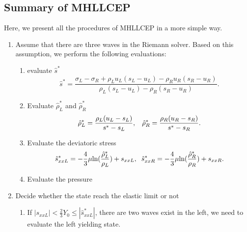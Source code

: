 \documentclass[review]{elsarticle}
\begin{document}
\subsection{Summary of MHLLCEP}
Here, we present all the procedures of MHLLCEP in a more simple way.
\begin{enumerate}
  \item  Assume  that there are three  waves in the Riemann solver. Based on this assumption, we perform the following evaluations:
  \begin{enumerate}
    \item evaluate  $\hat{s}^*$
    \begin{equation*}
       \hat{s}^* = \frac{\sigma_L-\sigma_R+\rho_L u_L(s_L-u_L)-\rho_R u_R(s_R-u_R)}{\rho_L(s_L-u_L)-\rho_R(s_R-u_R)}.
   \end{equation*}
    \item Evaluate  $\hat{\rho}_L^*$ and $\hat{\rho}_R^*$
    \begin{equation*}
       \hat{\rho}_L^* = \frac{\rho_L(u_L-s_L)}{s^*-s_L}, \hspace{0.3cm}  \hat{\rho}_R^* = \frac{\rho_R(u_R-s_R)}{s^*-s_R}.
    \end{equation*}
    \item Evaluate  the deviatoric stress
       \begin{equation*}
        \hat{s}_{xxL}^*=-\frac{4}{3}\mu\text{ln}(\frac{\hat{\rho}_L^*}{\rho_L})+s_{xxL},\hspace{0.2cm}  \hat{s}_{xxR}^*=-\frac{4}{3}\mu\text{ln}(\frac{\hat{\rho}_R^*}{\rho_R})+s_{xxR}.
      \end{equation*}
    \item Evaluate the pressure
  \end{enumerate}
  \item Decide whether the state reach the elastic limit or not
        \begin{enumerate}
          \item If $|s_{xxL}| < \frac{2}{3}Y_0 \le |\hat{s}_{xxL}^*| $, there are two waves exist in the left, we need to  evaluate the left yielding state.


\end{enumerate}
\end{enumerate}
\end{document}
